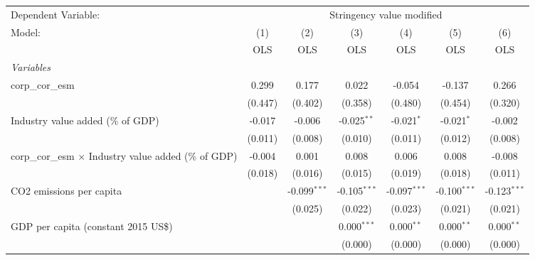 
\begingroup
\centering
\begin{tabular}{lcccccc}
   \toprule
   Dependent Variable: & \multicolumn{6}{c}{Stringency value modified}\\
   Model:                                                       & (1)     & (2)            & (3)            & (4)            & (5)            & (6)\\  
                                                                &  OLS    & OLS            & OLS            & OLS            & OLS            & OLS\\  
   \midrule
   \emph{Variables}\\
   corp\_cor\_esm                                               & 0.299   & 0.177          & 0.022          & -0.054         & -0.137         & 0.266\\   
                                                                & (0.447) & (0.402)        & (0.358)        & (0.480)        & (0.454)        & (0.320)\\   
   Industry value added (\% of GDP)                             & -0.017  & -0.006         & -0.025$^{**}$  & -0.021$^{*}$   & -0.021$^{*}$   & -0.002\\   
                                                                & (0.011) & (0.008)        & (0.010)        & (0.011)        & (0.012)        & (0.008)\\   
   corp\_cor\_esm $\times$ Industry value added (\% of GDP)     & -0.004  & 0.001          & 0.008          & 0.006          & 0.008          & -0.008\\   
                                                                & (0.018) & (0.016)        & (0.015)        & (0.019)        & (0.018)        & (0.011)\\   
   CO2 emissions per capita                                     &         & -0.099$^{***}$ & -0.105$^{***}$ & -0.097$^{***}$ & -0.100$^{***}$ & -0.123$^{***}$\\   
                                                                &         & (0.025)        & (0.022)        & (0.023)        & (0.021)        & (0.021)\\   
   GDP per capita (constant 2015 US\$)                          &         &                & 0.000$^{***}$  & 0.000$^{**}$   & 0.000$^{**}$   & 0.000$^{**}$\\   
                                                                &         &                & (0.000)        & (0.000)        & (0.000)        & (0.000)\\   

\end{tabular}
